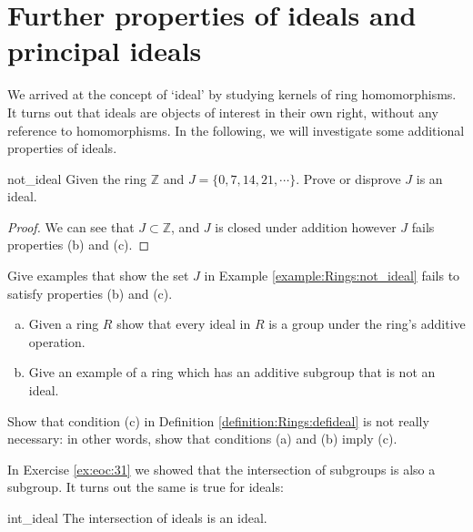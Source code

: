 \section{Further properties of ideals and principal ideals}
\label{sec:Rings:FurtherProperties}

We arrived at the concept of `ideal' by studying kernels of ring homomorphisms. It turns out that ideals are objects of interest in their own right, without any reference to homomorphisms. In the following, we will investigate some additional properties of ideals.

\begin{example}{not_ideal}
Given the ring ${\mathbb Z}$ and $J=\{0,7,14,21,\cdots\}$.  Prove or disprove $J$ is an ideal.
\end{example}

\begin{proof}
We can see that $J\subset {\mathbb Z}$, and $J$ is closed under addition however $J$ fails properties (b) and (c).
\end{proof}

\begin{exercise}{}
Give examples that show the set $J$ in Example \ref{example:Rings:not_ideal} fails to satisfy properties (b) and (c).
\end{exercise}

\begin{exercise}{}
\begin{enumerate}[(a)]
\item Given a ring $R$ show that every ideal in $R$ is a group under the ring's additive operation.
\item Give an example of a ring which has an additive subgroup that is not an ideal.
\end{enumerate}
\end{exercise}

\begin{exercise}{}
Show that condition (c) in Definition \ref{definition:Rings:defideal} is not really necessary:  in other words, show that conditions (a) and (b) imply (c).
\end{exercise}


In Exercise \ref{ex:eoc:31} we showed that the intersection of subgroups is also a subgroup.  It turns out the same is true for ideals:

\begin{prop}{int_ideal} 
The intersection of ideals is an ideal.
\end{prop}


